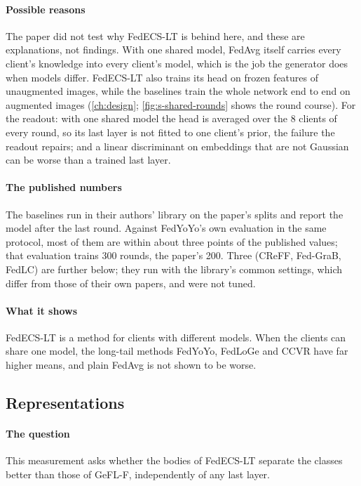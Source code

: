 \paragraph{Possible reasons} The paper did not test why FedECS-LT is behind here, and these are explanations, not
findings. With one shared model, FedAvg itself carries every client's knowledge into every client's model, which is
the job the generator does when models differ. FedECS-LT also trains its head on frozen features of unaugmented
images, while the baselines train the whole network end to end on augmented images (\cref{ch:design};
\cref{fig:s-shared-rounds} shows the round course). For the readout: with one shared model the head is averaged over
the 8 clients of every round, so its last layer is not fitted to one client's prior, the failure the readout repairs;
and a linear discriminant on embeddings that are not Gaussian can be worse than a trained last layer.

\paragraph{The published numbers} The baselines run in their authors' library on the paper's splits and report the
model after the last round. Against FedYoYo's own evaluation in the same protocol, most of them are within about three
points of the published values; that evaluation trains 300 rounds, the paper's 200. Three (CReFF, Fed-GraB, FedLC) are
further below; they run with the library's common settings, which differ from those of their own papers, and were not
tuned.

\paragraph{What it shows} FedECS-LT is a method for clients with different models. When the clients can share one
model, the long-tail methods FedYoYo, FedLoGe and CCVR have far higher means, and plain FedAvg is not shown to be worse.

\subsection{Representations}

\paragraph{The question} This measurement asks whether the bodies of FedECS-LT separate the classes better than those
of GeFL-F, independently of any last layer.

